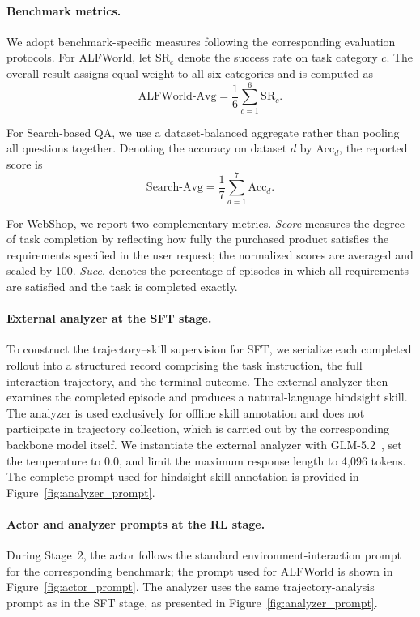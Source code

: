 \paragraph{Benchmark metrics.}
We adopt benchmark-specific measures following the corresponding evaluation protocols.
For ALFWorld, let $\mathrm{SR}_{c}$ denote the success rate on task category $c$.
The overall result assigns equal weight to all six categories and is computed as
\begin{equation}
    \mathrm{ALFWorld\text{-}Avg}
    =
    \frac{1}{6}
    \sum_{c=1}^{6}
    \mathrm{SR}_{c}.
\end{equation}

For Search-based QA, we use a dataset-balanced aggregate rather than pooling all questions together.
Denoting the accuracy on dataset $d$ by $\mathrm{Acc}_{d}$, the reported score is
\begin{equation}
    \mathrm{Search\text{-}Avg}
    =
    \frac{1}{7}
    \sum_{d=1}^{7}
    \mathrm{Acc}_{d}.
\end{equation}

For WebShop, we report two complementary metrics.
\textit{Score} measures the degree of task completion by reflecting how fully the purchased product satisfies the requirements specified in the user request; the normalized scores are averaged and scaled by 100.
\textit{Succ.} denotes the percentage of episodes in which all requirements are satisfied and the task is completed exactly.

\paragraph{External analyzer at the SFT stage.}
To construct the trajectory--skill supervision for SFT, we serialize each completed rollout into a structured record comprising the task instruction, the full interaction trajectory, and the terminal outcome.
The external analyzer then examines the completed episode and produces a natural-language hindsight skill.
The analyzer is used exclusively for offline skill annotation and does not participate in trajectory collection, which is carried out by the corresponding backbone model itself.
We instantiate the external analyzer with GLM-5.2~\citep{zai2026glm52}, set the temperature to 0.0, and limit the maximum response length to 4,096 tokens.
The complete prompt used for hindsight-skill annotation is provided in Figure~\ref{fig:analyzer_prompt}.

\paragraph{Actor and analyzer prompts at the RL stage.}
During Stage~2, the actor follows the standard environment-interaction prompt for the corresponding benchmark; the prompt used for ALFWorld is shown in Figure~\ref{fig:actor_prompt}.
The analyzer uses the same trajectory-analysis prompt as in the SFT stage, as presented in Figure~\ref{fig:analyzer_prompt}.


